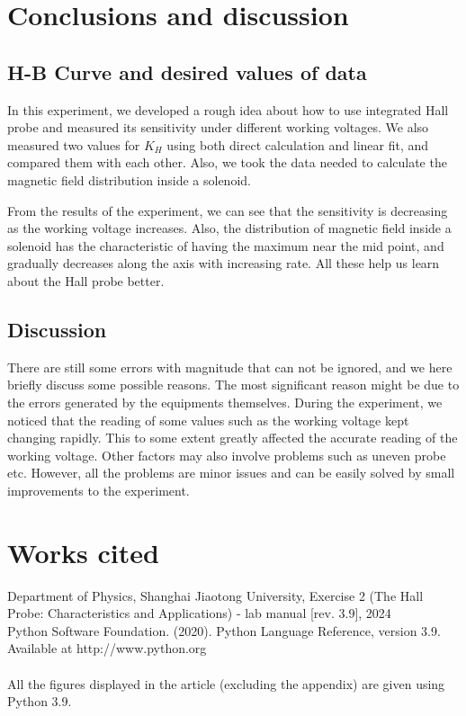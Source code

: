 \documentclass[12pt, a4paper, oneside]{article}
\begin{document}
\section{Conclusions and discussion}
\indent

\subsection{H-B Curve and desired values of data}
\indent

In this experiment, we developed a rough idea about how to use integrated Hall probe and measured its sensitivity under different
working voltages. We also measured two values for $K_H$ using both direct calculation and linear fit, and compared them with each other.
Also, we took the data needed to calculate the magnetic field distribution inside a solenoid.

From the results of the experiment, we can see that the sensitivity is decreasing as the working voltage increases. Also, the distribution 
of magnetic field inside a solenoid has the characteristic of having the maximum near the mid point, and gradually decreases along 
the axis with increasing rate. All these help us learn about the Hall probe better.

\subsection{Discussion}
\indent

There are still some errors with magnitude that can not be ignored, and we here briefly discuss some possible reasons. The most significant
reason might be due to the errors generated by the equipments themselves. During the experiment, we noticed that the reading of some values
such as the working voltage kept changing rapidly. This to some extent greatly affected the accurate reading of the working voltage. Other factors 
may also involve problems such as uneven probe etc. However, all the problems are minor issues and can be easily solved by small improvements
to the experiment. 

\section{Works cited}
Department of Physics, Shanghai Jiaotong University, Exercise 2 (The Hall Probe: Characteristics and Applications) - lab manual [rev. 3.9], 2024\\
Python Software Foundation. (2020). Python Language Reference, version 3.9. Available at http://www.python.org\\
\\
All the figures displayed in the article (excluding the appendix) are given using Python 3.9.
\pagebreak
\appendix
\end{document}

